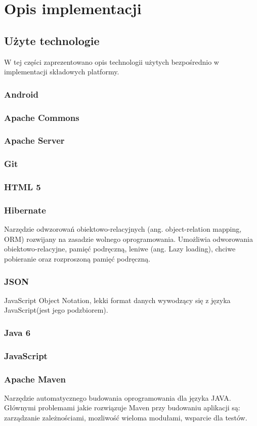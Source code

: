 \documentclass[11pt,a4paper,polish,thesis]{dcsbook}
\begin{document}
\chapter{Opis implementacji}
\section{Użyte technologie}
W tej części zaprezentowano opis technologii użytych bezpośrednio w implementacji składowych platformy.
\subsection{Android}
\subsection{Apache Commons}
\subsection{Apache Server}
\subsection{Git} 
\subsection{HTML 5}
\subsection{Hibernate}
Narzędzie odwzorowań obiektowo-relacyjnych (ang. object-relation mapping, ORM) rozwijany na zasadzie wolnego oprogramowania. Umożliwia odworowania obiektowo-relacyjne, pamięć podręczną, leniwe (ang. Lazy loading), chciwe pobieranie oraz rozproszoną pamięć podręczną.
\subsection{JSON}
JavaScript Object Notation, lekki format danych wywodzący się z języka JavaScript(jest jego podzbiorem). 
\subsection{Java 6}
\subsection{JavaScript}
\subsection{Apache Maven}
Narzędzie automatycznego budowania oprogramowania dla języka JAVA. Głównymi problemami jakie rozwiązuje Maven przy budowaniu aplikacji są: zarządzanie zależnościami, mozliwość wieloma modułami, wsparcie dla testów.
\end{document}
